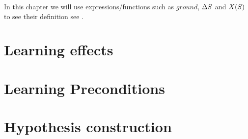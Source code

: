 \documentclass[Master.tex]{subfiles}
\begin{document}
In this chapter we will use expressions/functions such as $ground$, $\Delta S$ and $X(S)$ to see their definition see .

\section{Learning effects}\label{sec:NC:Effects}
    

\section{Learning Preconditions}\label{sec:NC:Preconditions}
    

\section{Hypothesis construction}\label{sec:NC:hypcon}
	
\end{document}
